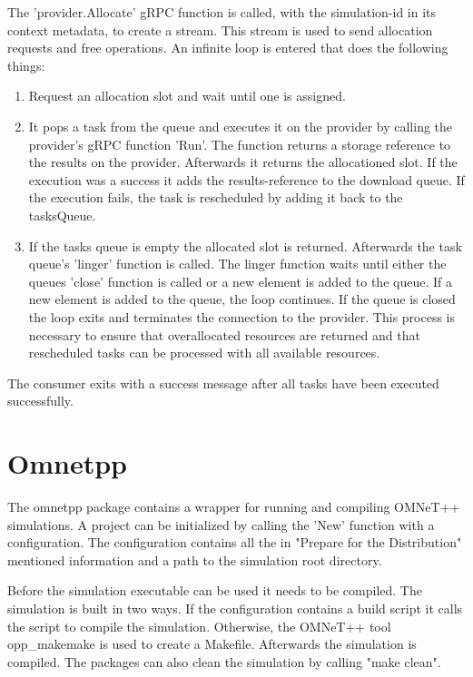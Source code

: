 The 'provider.Allocate' gRPC function is called, with the simulation-id in its context metadata, to create a stream. This stream is used to send allocation requests and free operations. An infinite loop is entered that does the following things:
\begin{enumerate}
    \item Request an allocation slot and wait until one is assigned.
    \item It pops a task from the queue and executes it on the provider by calling the provider's gRPC function 'Run'. The function returns a storage reference to the results on the provider. Afterwards it returns the allocationed slot. If the execution was a success it adds the results-reference to the download queue. If the execution fails, the task is rescheduled by adding it back to the tasksQueue.
    \item If the tasks queue is empty the allocated slot is returned. Afterwards the task queue's 'linger' function is called. The linger function waits until either the queues 'close' function is called or a new element is added to the queue. If a new element is added to the queue, the loop continues. If the queue is closed the loop exits and terminates the connection to the provider. This process is necessary to ensure that overallocated resources are returned and that rescheduled tasks can be processed with all available resources.
\end{enumerate}

The consumer exits with a success message after all tasks have been executed successfully.

\section{Omnetpp}
The omnetpp package contains a wrapper for running and compiling OMNeT++ simulations. A project can be initialized by calling the 'New' function with a configuration. The configuration contains all the in "Prepare for the Distribution" mentioned information and a path to the simulation root directory.

Before the simulation executable can be used it needs to be compiled. The simulation is built in two ways. If the configuration contains a build script it calls the script to compile the simulation. Otherwise, the OMNeT++ tool opp\_makemake is used to create a Makefile. Afterwards the simulation is compiled. The packages can also clean the simulation by calling "make clean".

